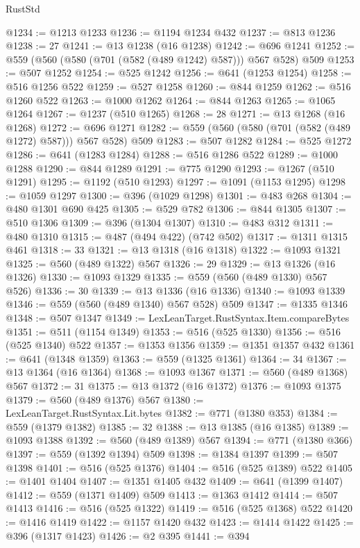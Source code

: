 \begin{lexlean}{RustStd}
\begin{coremodule}
@1234 := @1213 @1233
@1236 := @1194 @1234 @432
@1237 := @813 @1236
@1238 := 27
@1241 := @13 @1238 (@16 @1238)
@1242 := @696 @1241
@1252 := @559 (@560 (@580 (@701 (@582 (@489 @1242) @587))) @567 @528) @509
@1253 := @507 @1252
@1254 := @525 @1242
@1256 := @641 (@1253 @1254)
@1258 := @516 @1256 @522
@1259 := @527 @1258
@1260 := @844 @1259
@1262 := @516 @1260 @522
@1263 := @1000 @1262
@1264 := @844 @1263
@1265 := @1065 @1264
@1267 := @1237 (@510 @1265)
@1268 := 28
@1271 := @13 @1268 (@16 @1268)
@1272 := @696 @1271
@1282 := @559 (@560 (@580 (@701 (@582 (@489 @1272) @587))) @567 @528) @509
@1283 := @507 @1282
@1284 := @525 @1272
@1286 := @641 (@1283 @1284)
@1288 := @516 @1286 @522
@1289 := @1000 @1288
@1290 := @844 @1289
@1291 := @775 @1290
@1293 := @1267 (@510 @1291)
@1295 := @1192 (@510 @1293)
@1297 := @1091 (@1153 @1295)
@1298 := @1059 @1297
@1300 := @396 (@1029 @1298)
@1301 := @483 @268
@1304 := @480 @1301 @690 @425
@1305 := @529 @782
@1306 := @844 @1305
@1307 := @510 @1306
@1309 := @396 (@1304 @1307)
@1310 := @483 @312
@1311 := @480 @1310
@1315 := @487 (@494 @422) (@742 @502)
@1317 := @1311 @1315 @461
@1318 := 33
@1321 := @13 @1318 (@16 @1318)
@1322 := @1093 @1321
@1325 := @560 (@489 @1322) @567
@1326 := 29
@1329 := @13 @1326 (@16 @1326)
@1330 := @1093 @1329
@1335 := @559 (@560 (@489 @1330) @567 @526)
@1336 := 30
@1339 := @13 @1336 (@16 @1336)
@1340 := @1093 @1339
@1346 := @559 (@560 (@489 @1340) @567 @528) @509
@1347 := @1335 @1346
@1348 := @507 @1347
@1349 := LexLeanTarget.RustSyntax.Item.compareBytes
@1351 := @511 (@1154 @1349)
@1353 := @516 (@525 @1330)
@1356 := @516 (@525 @1340) @522
@1357 := @1353 @1356
@1359 := @1351 @1357 @432
@1361 := @641 (@1348 @1359)
@1363 := @559 (@1325 @1361)
@1364 := 34
@1367 := @13 @1364 (@16 @1364)
@1368 := @1093 @1367
@1371 := @560 (@489 @1368) @567
@1372 := 31
@1375 := @13 @1372 (@16 @1372)
@1376 := @1093 @1375
@1379 := @560 (@489 @1376) @567
@1380 := LexLeanTarget.RustSyntax.Lit.bytes
@1382 := @771 (@1380 @353)
@1384 := @559 (@1379 @1382)
@1385 := 32
@1388 := @13 @1385 (@16 @1385)
@1389 := @1093 @1388
@1392 := @560 (@489 @1389) @567
@1394 := @771 (@1380 @366)
@1397 := @559 (@1392 @1394) @509
@1398 := @1384 @1397
@1399 := @507 @1398
@1401 := @516 (@525 @1376)
@1404 := @516 (@525 @1389) @522
@1405 := @1401 @1404
@1407 := @1351 @1405 @432
@1409 := @641 (@1399 @1407)
@1412 := @559 (@1371 @1409) @509
@1413 := @1363 @1412
@1414 := @507 @1413
@1416 := @516 (@525 @1322)
@1419 := @516 (@525 @1368) @522
@1420 := @1416 @1419
@1422 := @1157 @1420 @432
@1423 := @1414 @1422
@1425 := @396 (@1317 @1423)
@1426 := @2 @395
@1441 := @394

\end{coremodule}
\end{lexlean}
